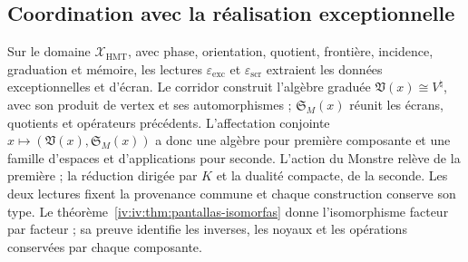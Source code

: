 \subsection{Coordination avec la réalisation exceptionnelle}

Sur le domaine \(\mathcal X_{\mathrm{HMT}}\), avec phase, orientation,
quotient, frontière, incidence, graduation et mémoire, les lectures
\(\varepsilon_{\mathrm{exc}}\) et \(\varepsilon_{\mathrm{scr}}\) extraient
les données exceptionnelles et d’écran. Le corridor construit l’algèbre
graduée \(\mathfrak V(x)\cong V^\natural\), avec son produit de vertex
et ses automorphismes ; \(\mathfrak S_M(x)\) réunit les écrans, quotients
et opérateurs précédents. L’affectation conjointe
\(x\mapsto(\mathfrak V(x),\mathfrak S_M(x))\) a donc une
algèbre pour première composante et une famille d’espaces et d’applications pour seconde.
L’action du Monstre relève de la première ; la réduction dirigée par \(K\)
et la dualité compacte, de la seconde. Les deux lectures fixent la provenance
commune et chaque construction conserve son type.
Le théorème~\ref{iv:iv:thm:pantallas-isomorfas} donne l’isomorphisme
facteur par facteur ; sa preuve identifie les inverses, les noyaux
et les opérations conservées par chaque composante.
